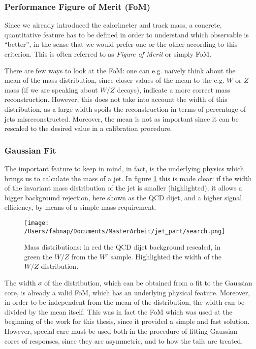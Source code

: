 \subsubsection{Performance Figure of Merit (FoM)}
Since we already introduced the calorimeter and track mass, a concrete, quantitative feature has to be defined in order to understand which observable is ``better'', in the sense that we would prefer one or the other according to this criterion. This is often referred to as \textit{Figure of Merit} or simply FoM.

There are few ways to look at the FoM: one can e.g. na\"ively think about the mean of the mass distribution, since closer values of the mean to the e.g. $W$ or $Z$ mass (if we are speaking about $W/Z$ decays), indicate a more correct mass reconstruction. However, this does not take into account the width of this distribution, as a large width spoils the reconstruction in terms of percentage of jets misreconstructed. Moreover, the mean is not as important since it can be rescaled to the desired value in a calibration procedure.

\subsubsection{Gaussian Fit}

The important feature to keep in mind, in fact, is the underlying physics which brings us to calculate the mass of a jet. In figure \ref{fig:search} this is made clear: if the width of the invariant mass distribution of the jet is smaller (highlighted), it allows a bigger background rejection, here shown as the QCD dijet, and a higher signal efficiency, by means of a simple mass requirement.

\begin{figure}[!ht]
  \centering
      \texttt{[image: /Users/fabnap/Documents/MasterArbeit/jet\_part/search.png]}
  \caption[QCD and $W'$ mass distribution]{Mass distributions: in red the QCD dijet background rescaled, in green the $W/Z$ from the $W'$ sample. Highlighted the width of the $W/Z$ distribution.}
  \label{fig:search}
\end{figure}

The width $\sigma$ of the distribution, which can be obtained from a fit to the Gaussian core, is already a valid FoM, which has an underlying physical feature. Moreover, in order to be independent from the mean of the distribution, the width can be divided by the mean itself.
This was in fact the FoM which was used at the beginning of the work for this thesis, since it provided a simple and fast solution. However, special care must be used both in the procedure of fitting Gaussian cores of responses, since they are asymmetric, and to how the tails are treated.

